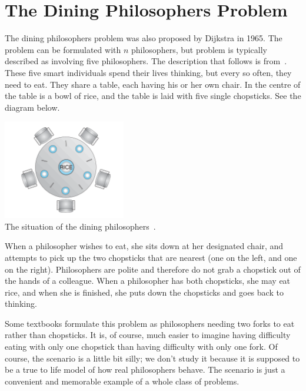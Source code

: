 




\section*{The Dining Philosophers Problem}

The dining philosophers problem was also proposed by Dijkstra in 1965. The problem can be formulated with $n$ philosophers, but problem is typically described as involving five philosophers. The description that follows is from~\cite{osc}. These five smart individuals spend their lives thinking, but every so often, they need to eat. They share a table, each having his or her own chair. In the centre of the table is a bowl of rice, and the table is laid with five single chopsticks. See the diagram below.

\begin{center}
\includegraphics[width=0.4\textwidth]{images/philosopher-table.png}\\
The situation of the dining philosophers~\cite{osc}.
\end{center}

When a philosopher wishes to eat, she sits down at her designated chair, and attempts to pick up the two chopsticks that are nearest (one on the left, and one on the right). Philosophers are polite and therefore do not grab a chopstick out of the hands of a colleague. When a philosopher has both chopsticks, she may eat rice, and when she is finished, she puts down the chopsticks and goes back to thinking.

Some textbooks formulate this problem as philosophers needing two forks to eat rather than chopsticks. It is, of course, much easier to imagine having difficulty eating with only one chopstick than having difficulty with only one fork. Of course, the scenario is a little bit silly; we don't study it because it is supposed to be a true to life model of how real philosophers behave. The scenario is just a convenient and memorable example of a whole class of problems.

